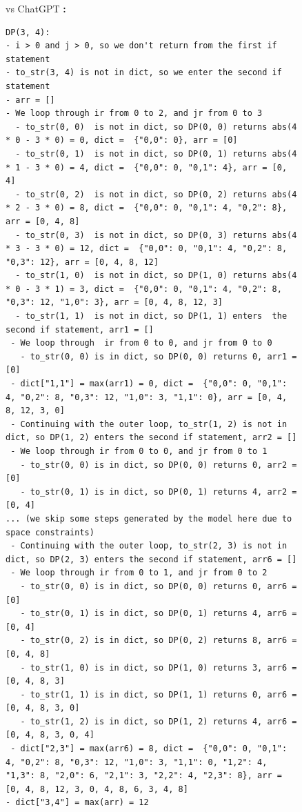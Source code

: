 \begin{figure}[H]
\begin{AIbox}{\DV vs ChatGPT}
{\bf\DV:}
\vspace{-0.1cm}
\begin{verbatim}
DP(3, 4):
- i > 0 and j > 0, so we don't return from the first if statement
- to_str(3, 4) is not in dict, so we enter the second if statement
- arr = []
- We loop through ir from 0 to 2, and jr from 0 to 3
  - to_str(0, 0)  is not in dict, so DP(0, 0) returns abs(4 * 0 - 3 * 0) = 0, dict =  {"0,0": 0}, arr = [0]
  - to_str(0, 1)  is not in dict, so DP(0, 1) returns abs(4 * 1 - 3 * 0) = 4, dict =  {"0,0": 0, "0,1": 4}, arr = [0, 4]
  - to_str(0, 2)  is not in dict, so DP(0, 2) returns abs(4 * 2 - 3 * 0) = 8, dict =  {"0,0": 0, "0,1": 4, "0,2": 8}, arr = [0, 4, 8]
  - to_str(0, 3)  is not in dict, so DP(0, 3) returns abs(4 * 3 - 3 * 0) = 12, dict =  {"0,0": 0, "0,1": 4, "0,2": 8, "0,3": 12}, arr = [0, 4, 8, 12]
  - to_str(1, 0)  is not in dict, so DP(1, 0) returns abs(4 * 0 - 3 * 1) = 3, dict =  {"0,0": 0, "0,1": 4, "0,2": 8, "0,3": 12, "1,0": 3}, arr = [0, 4, 8, 12, 3]
  - to_str(1, 1)  is not in dict, so DP(1, 1) enters  the second if statement, arr1 = [] 
 - We loop through  ir from 0 to 0, and jr from 0 to 0
   - to_str(0, 0) is in dict, so DP(0, 0) returns 0, arr1 = [0]
 - dict["1,1"] = max(arr1) = 0, dict =  {"0,0": 0, "0,1": 4, "0,2": 8, "0,3": 12, "1,0": 3, "1,1": 0}, arr = [0, 4, 8, 12, 3, 0]
 - Continuing with the outer loop, to_str(1, 2) is not in dict, so DP(1, 2) enters the second if statement, arr2 = []
 - We loop through ir from 0 to 0, and jr from 0 to 1
   - to_str(0, 0) is in dict, so DP(0, 0) returns 0, arr2 = [0]
   - to_str(0, 1) is in dict, so DP(0, 1) returns 4, arr2 = [0, 4]
... (we skip some steps generated by the model here due to space constraints)
 - Continuing with the outer loop, to_str(2, 3) is not in dict, so DP(2, 3) enters the second if statement, arr6 = []
 - We loop through ir from 0 to 1, and jr from 0 to 2
   - to_str(0, 0) is in dict, so DP(0, 0) returns 0, arr6 = [0]
   - to_str(0, 1) is in dict, so DP(0, 1) returns 4, arr6 = [0, 4]
   - to_str(0, 2) is in dict, so DP(0, 2) returns 8, arr6 = [0, 4, 8]
   - to_str(1, 0) is in dict, so DP(1, 0) returns 3, arr6 = [0, 4, 8, 3]
   - to_str(1, 1) is in dict, so DP(1, 1) returns 0, arr6 = [0, 4, 8, 3, 0]
   - to_str(1, 2) is in dict, so DP(1, 2) returns 4, arr6 = [0, 4, 8, 3, 0, 4]
 - dict["2,3"] = max(arr6) = 8, dict =  {"0,0": 0, "0,1": 4, "0,2": 8, "0,3": 12, "1,0": 3, "1,1": 0, "1,2": 4, "1,3": 8, "2,0": 6, "2,1": 3, "2,2": 4, "2,3": 8}, arr = [0, 4, 8, 12, 3, 0, 4, 8, 6, 3, 4, 8]
- dict["3,4"] = max(arr) = 12

\end{verbatim}
\end{AIbox}
\end{figure}
